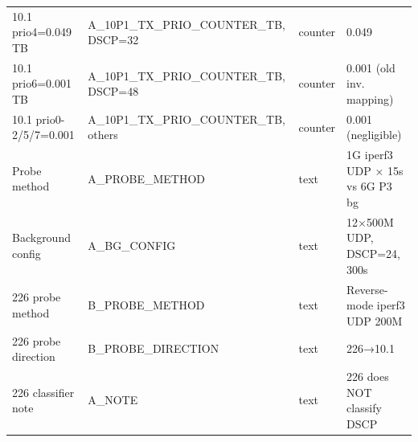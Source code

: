\begin{table}[htbp]
\begin{tabular}{llll}
10.1 prio4=0.049 TB & A\_10P1\_TX\_PRIO\_COUNTER\_TB, DSCP=32 & counter & 0.049\\
10.1 prio6=0.001 TB & A\_10P1\_TX\_PRIO\_COUNTER\_TB, DSCP=48 & counter & 0.001 (old inv. mapping)\\
10.1 prio0-2/5/7=0.001 & A\_10P1\_TX\_PRIO\_COUNTER\_TB, others & counter & 0.001 (negligible)\\
Probe method & A\_PROBE\_METHOD & text & 1G iperf3 UDP × 15s vs 6G P3 bg\\
Background config & A\_BG\_CONFIG & text & 12×500M UDP, DSCP=24, 300s\\
226 probe method & B\_PROBE\_METHOD & text & Reverse-mode iperf3 UDP 200M\\
226 probe direction & B\_PROBE\_DIRECTION & text & 226→10.1\\
226 classifier note & A\_NOTE & text & 226 does NOT classify DSCP\\
\bottomrule
\end{tabular}
\end{table}
